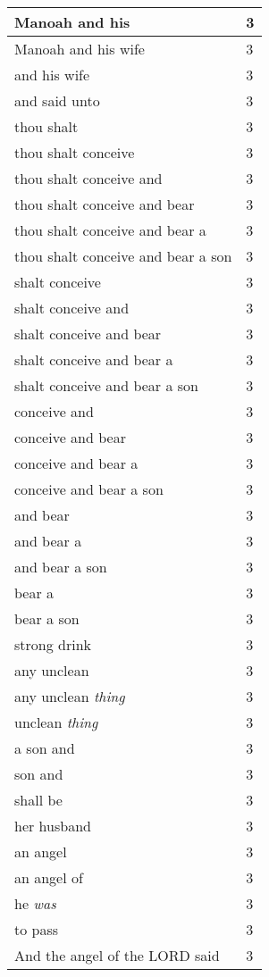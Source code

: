 \begin{center}
\begin{longtable}{|p{3.0in}|p{0.5in}|}
Manoah and his & 3\\ \hline 
Manoah and his wife & 3\\ \hline 
and his wife & 3\\ \hline 
and said unto & 3\\ \hline 
thou shalt & 3\\ \hline 
thou shalt conceive & 3\\ \hline 
thou shalt conceive and & 3\\ \hline 
thou shalt conceive and bear & 3\\ \hline 
thou shalt conceive and bear a & 3\\ \hline 
thou shalt conceive and bear a son & 3\\ \hline 
shalt conceive & 3\\ \hline 
shalt conceive and & 3\\ \hline 
shalt conceive and bear & 3\\ \hline 
shalt conceive and bear a & 3\\ \hline 
shalt conceive and bear a son & 3\\ \hline 
conceive and & 3\\ \hline 
conceive and bear & 3\\ \hline 
conceive and bear a & 3\\ \hline 
conceive and bear a son & 3\\ \hline 
and bear & 3\\ \hline 
and bear a & 3\\ \hline 
and bear a son & 3\\ \hline 
bear a & 3\\ \hline 
bear a son & 3\\ \hline 
strong drink & 3\\ \hline 
any unclean & 3\\ \hline 
any unclean \emph{thing} & 3\\ \hline 
unclean \emph{thing} & 3\\ \hline 
a son and & 3\\ \hline 
son and & 3\\ \hline 
shall be & 3\\ \hline 
her husband & 3\\ \hline 
an angel & 3\\ \hline 
an angel of & 3\\ \hline 
he \emph{was} & 3\\ \hline 
to pass & 3\\ \hline 
And the angel of the LORD said & 3\\ \hline 

\end{longtable}
\end{center}
